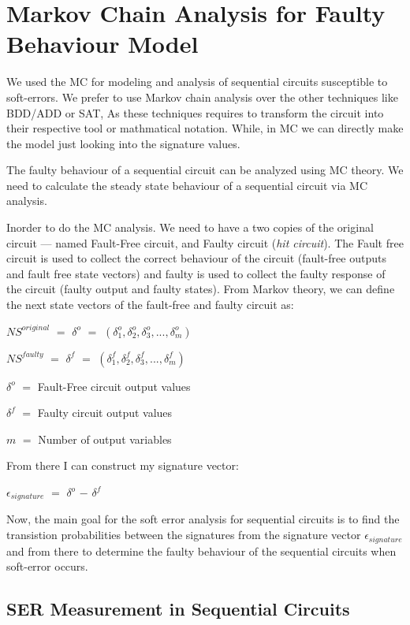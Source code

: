 \section{Markov Chain Analysis for Faulty Behaviour Model}

   
We used the MC for modeling and analysis of sequential circuits susceptible to soft-errors. We prefer to use Markov chain analysis over the other techniques like BDD/ADD or SAT, As these techniques requires to transform the circuit into their respective tool or mathmatical notation. While, in MC we can directly make the model just looking into the signature values. 


The faulty behaviour of a sequential circuit can be analyzed using MC theory. We need to calculate the steady state behaviour of a sequential circuit via MC analysis. 

Inorder to do the MC analysis. We need to have a two copies of the original circuit --- named Fault-Free circuit, and Faulty circuit (\textit{hit circuit}). The Fault free circuit is used to collect the correct behaviour of the circuit (fault-free outputs and fault free state vectors) and faulty is used to collect the faulty response of the circuit (faulty output and faulty states). From Markov theory, we can define the next state vectors of the fault-free and faulty circuit as:




$NS^{original}$ $=$  $\delta^{o}$ $=$ $(\delta^{o}_{1},\delta^{o}_{2},\delta^{o}_{3},...,\delta^{o}_{m})$


$NS^{faulty}$ $=$  $\delta^{f}$ $=$ $(\delta^{f}_{1},\delta^{f}_{2},\delta^{f}_{3},...,\delta^{f}_{m})$


$\delta^{o}$ $=$ Fault-Free circuit output values

$\delta^{f}$ $=$ Faulty circuit output values

$m$ $=$ Number of output variables

From there I can construct my signature vector:


$\epsilon_{signature}$ $=$ $\delta^{o}$  $-$ $\delta^{f}$


Now, the main goal for the soft error analysis for sequential circuits is to find the transistion probabilities between the signatures from the signature vector $\epsilon_{signature}$ and from there to determine the faulty behaviour of the sequential circuits when soft-error occurs. 

\subsection{SER Measurement in Sequential Circuits}

